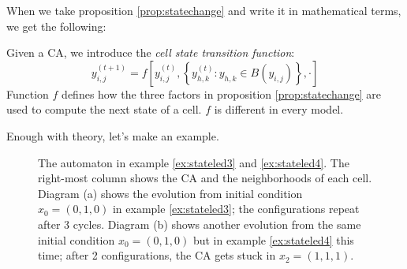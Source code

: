 When we take proposition \ref{prop:statechange} and write it in mathematical terms, we
get the following:

\begin{definition}
\label{def:statetransf}
Given a CA, we introduce the \textit{cell state transition function}:
\begin{equation}
y^{(t+1)}_{i,j} = f \left[ y^{(t)}_{i,j}, 
    \left\{ y^{(t)}_{h,k} : y_{h,k} \in B\left( y_{i,j} \right) \right\}, \cdot \right]
\end{equation}
Function $f$ defines how the three factors in proposition \ref{prop:statechange}
are used to compute the next state of a cell. $f$ is different in every model.
\end{definition}

Enough with theory, let's make an example.

%
\begin{figure}

\caption[The automaton in example \ref{ex:stateled3} and \ref{ex:stateled4}.]{The automaton
in example \ref{ex:stateled3} and \ref{ex:stateled4}.
The right-most column shows the CA and the neighborhoods of each cell.
Diagram (a) shows the evolution from initial condition $x_0 = (0,1,0)$ in example
\ref{ex:stateled3}; the configurations repeat after 3 cycles.
Diagram (b) shows another evolution from the same initial condition $x_0 = (0,1,0)$ but in example
\ref{ex:stateled4} this time;
after 2 configurations, the CA gets stuck in $x_2 = (1,1,1)$.}
\label{fig:threecell}
\end{figure}
%


